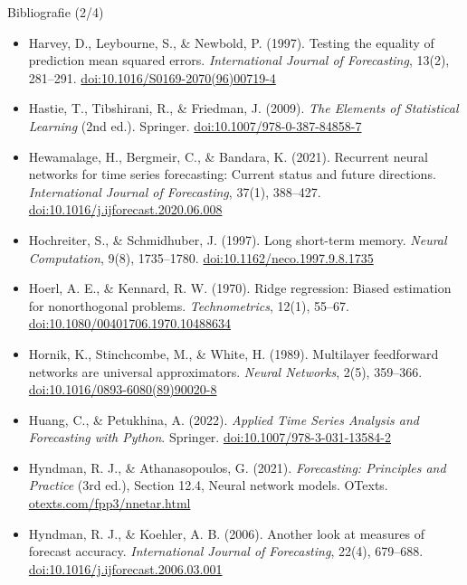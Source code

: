 \begin{frame}{Bibliografie (2/4)}
\itemsize{\scriptsize}
\begin{itemize}
    \item Harvey, D., Leybourne, S., \& Newbold, P. (1997). Testing the equality of prediction mean squared errors. \textit{International Journal of Forecasting}, 13(2), 281--291. \href{https://doi.org/10.1016/S0169-2070(96)00719-4}{doi:10.1016/S0169-2070(96)00719-4}
    \item Hastie, T., Tibshirani, R., \& Friedman, J. (2009). \textit{The Elements of Statistical Learning} (2nd ed.). Springer. \href{https://doi.org/10.1007/978-0-387-84858-7}{doi:10.1007/978-0-387-84858-7}
    \item Hewamalage, H., Bergmeir, C., \& Bandara, K. (2021). Recurrent neural networks for time series forecasting: Current status and future directions. \textit{International Journal of Forecasting}, 37(1), 388--427. \href{https://doi.org/10.1016/j.ijforecast.2020.06.008}{doi:10.1016/j.ijforecast.2020.06.008}
    \item Hochreiter, S., \& Schmidhuber, J. (1997). Long short-term memory. \textit{Neural Computation}, 9(8), 1735--1780. \href{https://doi.org/10.1162/neco.1997.9.8.1735}{doi:10.1162/neco.1997.9.8.1735}
    \item Hoerl, A. E., \& Kennard, R. W. (1970). Ridge regression: Biased estimation for nonorthogonal problems. \textit{Technometrics}, 12(1), 55--67. \href{https://doi.org/10.1080/00401706.1970.10488634}{doi:10.1080/00401706.1970.10488634}
    \item Hornik, K., Stinchcombe, M., \& White, H. (1989). Multilayer feedforward networks are universal approximators. \textit{Neural Networks}, 2(5), 359--366. \href{https://doi.org/10.1016/0893-6080(89)90020-8}{doi:10.1016/0893-6080(89)90020-8}
    \item Huang, C., \& Petukhina, A. (2022). \textit{Applied Time Series Analysis and Forecasting with Python}. Springer. \href{https://doi.org/10.1007/978-3-031-13584-2}{doi:10.1007/978-3-031-13584-2}
    \item Hyndman, R. J., \& Athanasopoulos, G. (2021). \textit{Forecasting: Principles and Practice} (3rd ed.), Section 12.4, Neural network models. OTexts. \href{https://otexts.com/fpp3/nnetar.html}{otexts.com/fpp3/nnetar.html}
    \item Hyndman, R. J., \& Koehler, A. B. (2006). Another look at measures of forecast accuracy. \textit{International Journal of Forecasting}, 22(4), 679--688. \href{https://doi.org/10.1016/j.ijforecast.2006.03.001}{doi:10.1016/j.ijforecast.2006.03.001}
\end{itemize}
\end{frame}

